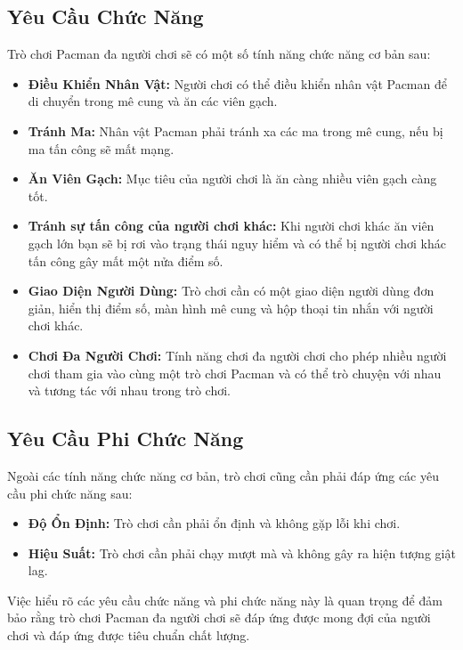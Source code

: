 \documentclass[a4paper]{article}
\begin{document}
\subsection{Yêu Cầu Chức Năng}

Trò chơi Pacman đa người chơi sẽ có một số tính năng chức năng cơ bản sau:

\begin{itemize}
    \item \textbf{Điều Khiển Nhân Vật:} Người chơi có thể điều khiển nhân vật Pacman để di chuyển trong mê cung và ăn các viên gạch.
    \item \textbf{Tránh Ma:} Nhân vật Pacman phải tránh xa các ma trong mê cung, nếu bị ma tấn công sẽ mất mạng.
    \item \textbf{Ăn Viên Gạch:} Mục tiêu của người chơi là ăn càng nhiều viên gạch càng tốt.
    \item \textbf{Tránh sự tấn công của người chơi khác:} Khi người chơi khác ăn viên gạch lớn bạn sẽ bị rơi vào trạng thái nguy hiểm và có thể bị người chơi khác tấn công gây mất một nửa điểm số.
    \item \textbf{Giao Diện Người Dùng:} Trò chơi cần có một giao diện người dùng đơn giản, hiển thị điểm số, màn hình mê cung và hộp thoại tin nhắn với người chơi khác.
    \item \textbf{Chơi Đa Người Chơi:} Tính năng chơi đa người chơi cho phép nhiều người chơi tham gia vào cùng một trò chơi Pacman và có thể trò chuyện với nhau và tương tác với nhau trong trò chơi.
\end{itemize}

\subsection{Yêu Cầu Phi Chức Năng}

Ngoài các tính năng chức năng cơ bản, trò chơi cũng cần phải đáp ứng các yêu cầu phi chức năng sau:

\begin{itemize}
    \item \textbf{Độ Ổn Định:} Trò chơi cần phải ổn định và không gặp lỗi khi chơi.
    \item \textbf{Hiệu Suất:} Trò chơi cần phải chạy mượt mà và không gây ra hiện tượng giật lag.
\end{itemize}

Việc hiểu rõ các yêu cầu chức năng và phi chức năng này là quan trọng để đảm bảo rằng trò chơi Pacman đa người chơi sẽ đáp ứng được mong đợi của người chơi và đáp ứng được tiêu chuẩn chất lượng.
\end{document}
